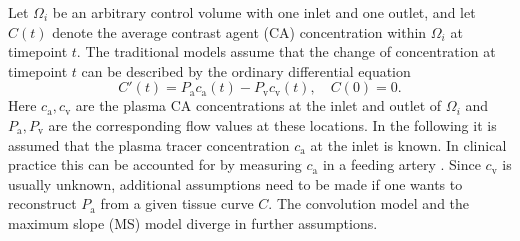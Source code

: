 \documentclass[journal,twocolumn]{IEEEtran}
\newcommand{\ca}{c_\mathrm{a}}
\newcommand{\cout}{c_{\mathrm{v}}}
\newcommand{\Pa}{P_{\mathrm{a}}}
\newcommand{\Pout}{P_{\mathrm{v}}}
\begin{document}
	Let $\Omega_i$ be an arbitrary control volume with one inlet and one outlet, and let $C(t)$ denote the average contrast agent (CA) concentration within $\Omega_i$ at timepoint $t$.
	The traditional models assume that the change of concentration at timepoint $t$ can be described by the ordinary differential equation 
	\begin{equation}\label{eq:classicgeneral}
		C'(t) = \Pa\ca(t) - \Pout\cout(t), \quad C(0) = 0.
	\end{equation}
	Here $\ca,\cout$ are the plasma CA concentrations at the inlet and outlet of $\Omega_i$ and $\Pa,\Pout$ are the corresponding flow values at these locations.
	In the following it is assumed that the plasma tracer concentration $\ca$ at the inlet is known.
	In clinical practice this can be accounted for by measuring $\ca$ in a feeding artery \cite{ostergaard96}.
	Since $\cout$ is usually unknown, additional assumptions need to be made if one wants to reconstruct $\Pa$ from a given tissue curve $C$. The convolution model and the maximum slope (MS) model diverge in further assumptions.

	

\end{document}
